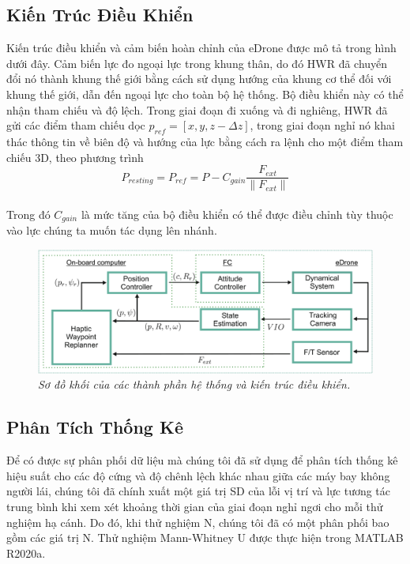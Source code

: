 \documentclass[12pt,a4paper]{article}
\begin{document}
\subsection{Kiến Trúc Điều Khiển }
Kiến trúc điều khiển và cảm biến hoàn chỉnh của eDrone được mô tả trong hình dưới đây. Cảm biến lực đo ngoại lực trong khung thân, do đó HWR đã chuyển đổi nó thành khung thế giới bằng cách sử dụng hướng của khung cơ thể đối với khung thế giới, dẫn đến ngoại lực cho toàn bộ hệ thống. Bộ điều khiển này có thể nhận tham chiếu và độ lệch. Trong giai đoạn đi xuống và đi nghiêng, HWR đã gửi các điểm tham chiếu dọc $\textit{p}_{ref} = [x, y, z -\Delta{z}]$, trong giai đoạn nghỉ nó khai thác thông tin về biên độ và hướng của lực bằng cách ra lệnh cho một điểm tham chiếu 3D, theo phương trình\\
 $$P_{resting} = P_{ref} = P - C_{gain} \frac{F_{ext}}{\|{F_{ext}}\|} $$ \\
 Trong đó $C_{gain}$ là mức tăng của bộ điều khiển có thể được điều chỉnh tùy thuộc vào lực chúng ta muốn tác dụng lên nhánh.\\
 \begin{figure}[ht!]
    \centering
    \includegraphics[scale = 1]{hinh 8}
    \caption{\textit{Sơ đồ khối của các thành phần hệ thống và kiến trúc điều khiển.}}
    \label{fig8}
\end{figure}
\subsection{Phân Tích Thống Kê}
Để có được sự phân phối dữ liệu mà chúng tôi đã sử dụng để phân tích thống kê hiệu suất cho các độ cứng và độ chênh lệch khác nhau giữa các máy bay không người lái, chúng tôi đã chính xuất một giá trị SD của lỗi vị trí và lực tương tác trung bình khi xem xét khoảng thời gian của giai đoạn nghỉ ngơi cho mỗi thử nghiệm hạ cánh. Do đó, khi thử nghiệm N, chúng tôi đã có một phân phối bao gồm các giá trị N. Thử nghiệm Mann-Whitney U được thực hiện trong MATLAB R2020a.\\
\end{document}
